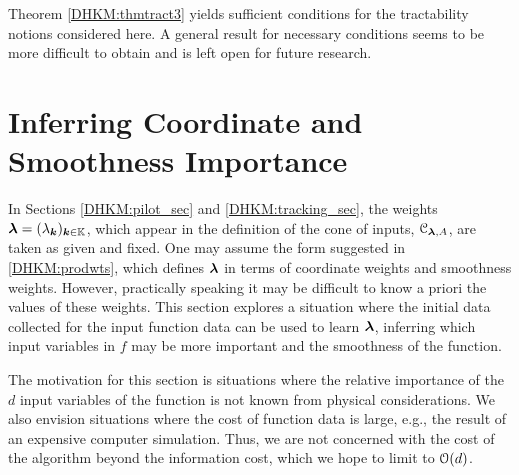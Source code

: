 \documentclass[USenglish]{article}
\theoremstyle{dgthm}
\theoremstyle{dgthm}
\theoremstyle{dgthm}
\theoremstyle{dgthm}
\theoremstyle{dgdef}
\theoremstyle{definition}
\begin{document}
Theorem \ref{DHKM:thmtract3} yields sufficient conditions for the tractability notions considered 
here. A general result for necessary conditions seems to be more difficult to obtain and is left open for future research.



\section{Inferring Coordinate and Smoothness Importance} \label{DHKM:smoothimportance_sec}

In Sections \ref{DHKM:pilot_sec} and \ref{DHKM:tracking_sec}, the weights ${\boldsymbol{\lambda}} = (\lambda_{{\boldsymbol{k}}})_{{\boldsymbol{k}} \in {\mathbb{K}}}$, which appear in the definition of the cone of inputs, ${\mathcal{C}}_{{\boldsymbol{\lambda}},A}$, are taken as given and fixed.  One may assume the form suggested in \eqref{DHKM:prodwts}, which defines ${\boldsymbol{\lambda}}$ in terms of coordinate weights and smoothness weights.  However, practically speaking it may be difficult to know a priori the values of these weights.
This section explores a situation where the initial data collected for the input function data can be used to learn ${\boldsymbol{\lambda}}$, inferring which input variables in $f$ may be more important and the smoothness of the function.  

The motivation for this section is situations where the relative importance of the $d$ input variables of the function is not known from physical considerations. We also envision situations where the cost of function data is large, e.g., the result of an expensive computer simulation.  Thus, we are not concerned with the cost of the algorithm beyond the information cost, which we hope to limit to ${\mathcal{O}}(d)$.
\end{document}
